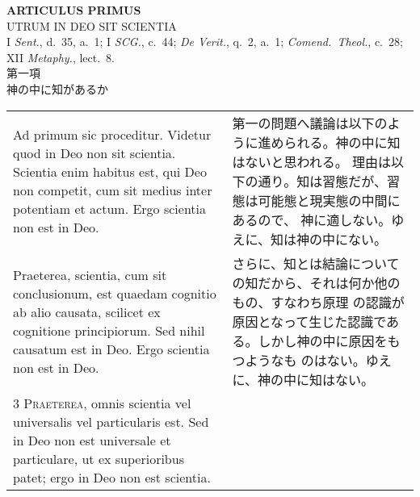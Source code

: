 \documentclass[10pt]{jsarticle} %
\begin{document}
\newpage
{}
\begin{center}
{\Large {\bfseries ARTICULUS PRIMUS}}\\
{\large UTRUM IN DEO SIT SCIENTIA}\\
{\footnotesize I {\itshape Sent.}, d.~35, a.~1; I {\itshape SCG.}, c.~44; {\itshape De Verit.}, q.~2, a.~1; {\itshape Comend.~Theol.}, c.~28; XII {\itshape Metaphy.}, lect.~8.}\\
{\Large 第一項\\神の中に知があるか}
\end{center}

\begin{longtable}{p{21em}p{21em}}

{\huge A}{\sc d primum sic proceditur}. 
Videtur quod in Deo non sit scientia. Scientia enim habitus est, qui Deo
 non competit, cum sit medius inter potentiam et actum. Ergo scientia
 non est in Deo.

&

第一の問題へ議論は以下のように進められる。神の中に知はないと思われる。
理由は以下の通り。知は習態だが、習態は可能態と現実態の中間にあるので、
神に適しない。ゆえに、知は神の中にない。

\\

{\sc 2 Praeterea}, scientia, cum sit conclusionum, est quaedam cognitio
ab alio causata, scilicet ex cognitione principiorum. Sed nihil causatum
est in Deo. Ergo scientia non est in Deo.

&

さらに、知とは結論についての知だから、それは何か他のもの、すなわち原理
の認識が原因となって生じた認識である。しかし神の中に原因をもつようなも
のはない。ゆえに、神の中に知はない。

\\

{\scshape 3 Praeterea}, omnis scientia vel universalis vel particularis
est. Sed in Deo non est universale et particulare, ut ex superioribus
patet; ergo in Deo non est scientia.

&


\end{longtable}
\end{document}
